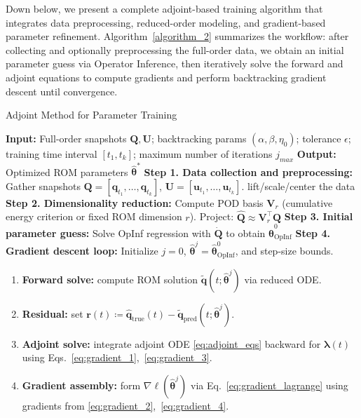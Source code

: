Down below, we present a complete adjoint-based training algorithm that integrates data preprocessing, reduced-order modeling, and gradient-based parameter refinement. Algorithm~\ref{algorithm_2} summarizes the workflow: after collecting and optionally preprocessing the full-order data, we obtain an initial parameter guess via Operator Inference, then iteratively solve the forward and adjoint equations to compute gradients and perform backtracking gradient descent until convergence.

\begin{center}
\begin{minipage}{0.95\textwidth}
\begin{algorithm}[H]
\caption{Adjoint Method for Parameter Training}\label{algorithm_2}
\SetAlgoNoLine
\textbf{Input:} Full-order snapshots $\mathbf{Q},\mathbf{U}$; backtracking params $(\alpha,\beta,\eta_0)$; tolerance $\epsilon$; training time interval $[t_1, t_k]$; maximum number of iterations $j_{max}$\;
\textbf{Output:} Optimized ROM parameters $\hat{\bm\theta}^*$\;
\vspace{0.3cm}
\textbf{Step 1. Data collection and preprocessing:} Gather snapshots $\mathbf{Q}=[\mathbf{q}_{t_1},\dots,\mathbf{q}_{t_k}]$, $\mathbf{U}=[\mathbf{u}_{t_1},\dots,\mathbf{u}_{t_k}]$.
\quad [Optional] lift/scale/center the data\;
\textbf{Step 2. Dimensionality reduction:} Compute POD basis $\mathbf{V}_r$ (cumulative energy criterion or fixed ROM dimension $r$). Project: $\hat{\mathbf{Q}} \approx \mathbf{V}_r^\top\mathbf{Q}$\;
\textbf{Step 3. Initial parameter guess:} Solve OpInf regression with $\dot{\mathbf{Q}}$ to obtain $\hat{\bm\theta}^{0}_{\text{OpInf}}$\;
\textbf{Step 4. Gradient descent loop:}
Initialize $j=0$, $\hat{\bm\theta}^j=\hat{\bm\theta}^{0}_{\text{OpInf}}$, and step-size bounds.
\begin{enumerate}[label=\arabic*.]
  \item \textbf{Forward solve:}
    compute ROM solution $\tilde{\mathbf{q}}(t;\hat{\bm\theta}^j)$ via reduced ODE.
  \item \textbf{Residual:}
    set $\mathbf{r}(t)\coloneqq\hat{\mathbf{q}}_{\text{true}}(t)-\tilde{\mathbf{q}}_{\text{pred}}(t;\hat{\bm\theta}^j)$.
  \item \textbf{Adjoint solve:}
    integrate adjoint ODE \eqref{eq:adjoint_eqs} backward for $\bm\lambda(t)$ using Eqs.~\eqref{eq:gradient_1},~\eqref{eq:gradient_3}.
  \item \textbf{Gradient assembly:}
    form $\nabla\ell(\hat{\bm\theta}^j)$ via Eq.~\eqref{eq:gradient_lagrange} using gradients from \eqref{eq:gradient_2},~\eqref{eq:gradient_4}.

\end{enumerate}
\end{algorithm}
\end{minipage}
\end{center}
